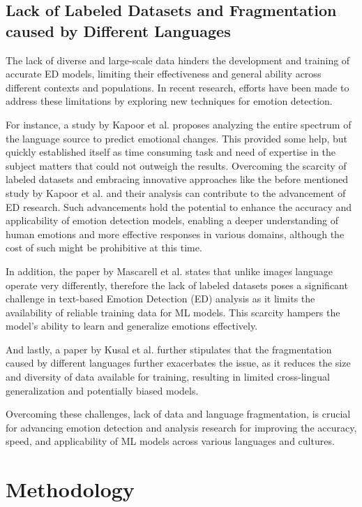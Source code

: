 \documentclass[11pt]{article}
\begin{document}
\subsection{Lack of Labeled Datasets and Fragmentation caused by Different Languages}
The lack of diverse and large-scale data hinders the development and training of accurate ED models, limiting their effectiveness and general ability across different contexts and populations. In recent research, efforts have been made to address these limitations by exploring new techniques for emotion detection.

For instance, a study by Kapoor\cite{KAPOOR2023120882} et al. proposes analyzing the entire spectrum of the language source to predict emotional changes. This provided some help, but quickly established itself as time consuming task and need of expertise in the subject matters that could not outweigh the results. Overcoming the scarcity of labeled datasets and embracing innovative approaches like the before mentioned study by Kapoor\cite{KAPOOR2023120882} et al. and their analysis can contribute to the advancement of ED research. Such advancements hold the potential to enhance the accuracy and applicability of emotion detection models, enabling a deeper understanding of human emotions and more effective responses in various domains, although the cost of such might be prohibitive at this time.

In addition, the paper by Mascarell\cite{mascarell-etal-2021-stance} et al. states that unlike images language operate very differently, therefore the lack of labeled datasets poses a significant challenge in text-based Emotion Detection (ED) analysis as it limits the availability of reliable training data for ML models. This scarcity hampers the model's ability to learn and generalize emotions effectively.

And lastly, a paper by Kusal et al. further stipulates \cite{kusal} that the fragmentation caused by different languages further exacerbates the issue, as it reduces the size and diversity of data available for training, resulting in limited cross-lingual generalization and potentially biased models.

Overcoming these challenges, lack of data and language fragmentation, is crucial for advancing emotion detection and analysis research for improving the accuracy, speed, and applicability of ML models across various languages and cultures.

\clearpage
\section{Methodology}
\end{document}
